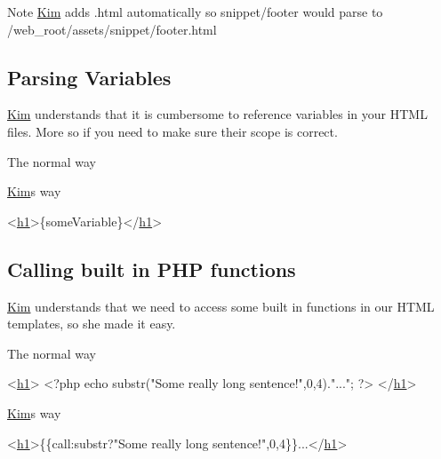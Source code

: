 \begin{DoxyNote}{Note}
\hyperlink{classKim}{Kim} adds .html automatically so snippet/footer would parse to /web\+\_\+root/assets/snippet/footer.html
\end{DoxyNote}
\hypertarget{index_kim_parse_variable}{}\subsection{Parsing Variables}\label{index_kim_parse_variable}
\hyperlink{classKim}{Kim} understands that it is cumbersome to reference variables in your H\+T\+M\+L files. More so if you need to make sure their scope is correct.

The normal way 


\hyperlink{classKim}{Kim}\textquotesingle{}s way 
\begin{DoxyCode}
<\hyperlink{Shape_8php_a92ed2229ea45cf3c0e84a02cf12a7533}{h1}>\{someVariable\}</\hyperlink{Shape_8php_a92ed2229ea45cf3c0e84a02cf12a7533}{h1}>
\end{DoxyCode}
\hypertarget{index_kim_calling_php}{}\subsection{Calling built in P\+H\+P functions}\label{index_kim_calling_php}
\hyperlink{classKim}{Kim} understands that we need to access some built in functions in our H\+T\+M\+L templates, so she made it easy.

The normal way 
\begin{DoxyCode}
<\hyperlink{Shape_8php_a92ed2229ea45cf3c0e84a02cf12a7533}{h1}>
<?php
  echo substr(\textcolor{stringliteral}{"Some really long sentence!"},0,4).\textcolor{stringliteral}{"..."};
?>
</\hyperlink{Shape_8php_a92ed2229ea45cf3c0e84a02cf12a7533}{h1}>
\end{DoxyCode}


\hyperlink{classKim}{Kim}\textquotesingle{}s way 
\begin{DoxyCode}
<\hyperlink{Shape_8php_a92ed2229ea45cf3c0e84a02cf12a7533}{h1}>\{\{call:substr?\textcolor{stringliteral}{"Some really long sentence!"},0,4\}\}...</\hyperlink{Shape_8php_a92ed2229ea45cf3c0e84a02cf12a7533}{h1}>
\end{DoxyCode}


